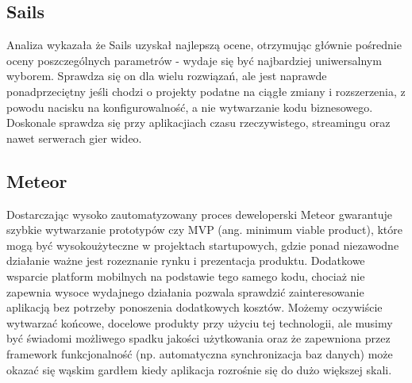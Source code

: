 \documentclass[12pt]{report}
\begin{document}
    \subsection{Sails}
      Analiza wykazała że Sails uzyskał najlepszą ocene, otrzymując głównie pośrednie oceny poszczególnych parametrów - wydaje się być najbardziej uniwersalnym wyborem.
      Sprawdza się on dla wielu rozwiązań, ale jest naprawde ponadprzeciętny jeśli chodzi o projekty podatne na ciągłe zmiany i rozszerzenia, z powodu nacisku na konfigurowalność, a nie wytwarzanie kodu biznesowego.
      Doskonale sprawdza się przy aplikacjiach czasu rzeczywistego, streamingu oraz nawet serwerach gier wideo.

    \subsection{Meteor}
      Dostarczając wysoko zautomatyzowany proces deweloperski Meteor gwarantuje szybkie wytwarzanie prototypów czy MVP (ang. minimum viable product), które mogą być wysokoużyteczne w projektach startupowych, gdzie ponad niezawodne działanie ważne jest rozeznanie rynku i prezentacja produktu.
      Dodatkowe wsparcie platform mobilnych na podstawie tego samego kodu, chociaż nie zapewnia wysoce wydajnego działania pozwala sprawdzić zainteresowanie aplikacją bez potrzeby ponoszenia dodatkowych kosztów.
      Możemy oczywiście wytwarzać końcowe, docelowe produkty przy użyciu tej technologii, ale musimy być świadomi możliwego spadku jakości użytkowania oraz że zapewniona przez framework funkcjonalność (np. automatyczna synchronizacja baz danych) może okazać się wąskim gardłem kiedy aplikacja rozrośnie się do dużo większej skali.

\end{document}
